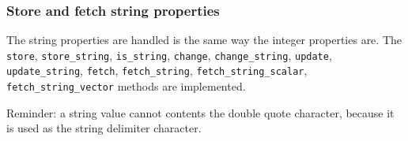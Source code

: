 \subsubsection{Store and fetch string properties}


The  string  properties  are  handled  is the  same  way  the  integer
properties    are.    The    \texttt{store},   \texttt{store\_string},
\texttt{is\_string},     \texttt{change},     \texttt{change\_string},
\texttt{update},        \texttt{update\_string},       \texttt{fetch},
\texttt{fetch\_string},
\texttt{fetch\_string\_scalar},
\texttt{fetch\_string\_vector} methods are implemented.

\pn  Reminder:  a  string  value  cannot  contents  the  double  quote
character, because it is used as the string delimiter character.

